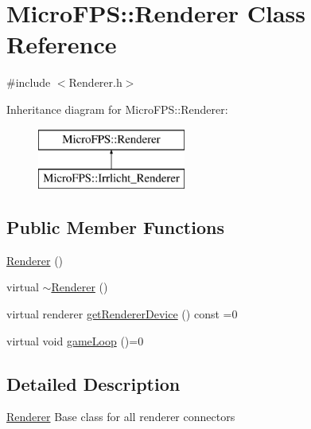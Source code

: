\hypertarget{class_micro_f_p_s_1_1_renderer}{
\section{MicroFPS::Renderer Class Reference}
\label{d6/de2/class_micro_f_p_s_1_1_renderer}
}


{\ttfamily \#include $<$Renderer.h$>$}

Inheritance diagram for MicroFPS::Renderer:\begin{figure}[H]
\begin{center}
\leavevmode
\includegraphics[height=2.000000cm]{d6/de2/class_micro_f_p_s_1_1_renderer}
\end{center}
\end{figure}
\subsection*{Public Member Functions}
\begin{DoxyCompactItemize}
\item 
\hyperlink{class_micro_f_p_s_1_1_renderer_a6e485790e7feded6cda1c6c69cf20940}{Renderer} ()
\item 
virtual \hyperlink{class_micro_f_p_s_1_1_renderer_a89ef8839d0624fc08d55bcad40a4898d}{$\sim$Renderer} ()
\item 
virtual renderer \hyperlink{class_micro_f_p_s_1_1_renderer_a092a7585391cd2a6067c80d8d989e8dd}{getRendererDevice} () const =0
\item 
virtual void \hyperlink{class_micro_f_p_s_1_1_renderer_a855df0a5be7f49d50f5de6be106376c3}{gameLoop} ()=0
\end{DoxyCompactItemize}


\subsection{Detailed Description}
\hyperlink{class_micro_f_p_s_1_1_renderer}{Renderer} Base class for all renderer connectors 

